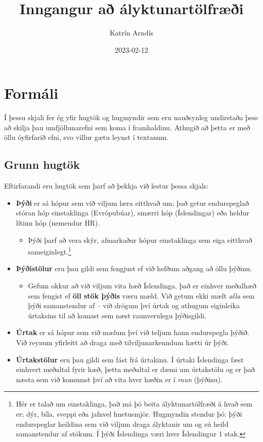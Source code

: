 \documentclass[
]{book}
\title{Inngangur að ályktunartölfræði}
\author{Katrín Arndís}
\date{2023-02-12}
\providecommand{\tightlist}{%
  \setlength{\itemsep}{0pt}\setlength{\parskip}{0pt}}
\begin{document}
\maketitle

{
\setcounter{tocdepth}{1}
\tableofcontents
}
\hypertarget{formuxe1li}{%
\chapter{Formáli}\label{formuxe1li}}

Í þessu skjali fer ég yfir hugtök og hugmyndir sem eru nauðsynleg
undirstaða þess að skilja þau umfjöllunarefni sem koma í framhaldinu.
Athugið að þetta er með öllu óyfirfarið efni, svo villur gætu leynst í
textanum.

\hypertarget{grunn-hugtuxf6k}{%
\section{Grunn hugtök}\label{grunn-hugtuxf6k}}

Eftirfarandi eru hugtök sem þarf að þekkja við lestur þessa skjals:

\begin{itemize}
\tightlist
\item
  \textbf{Þýði} er sá hópur sem við viljum læra eitthvað um; það getur
  endurspeglað stóran hóp einstaklinga (Evrópubúar), smærri hóp
  (Íslendingar) eða heldur lítinn hóp (nemendur HR).

  \begin{itemize}
  \tightlist
  \item
    Þýði þarf að vera skýr, afmarkaður hópur einstaklinga sem eiga
    eitthvað sameiginlegt.\footnote{Hér er talað um einstaklinga, það má þó beita
      ályktunartölfræði á hvað sem er; dýr, bíla, sveppi eða jafnvel
      hnetusmjör. Hugmyndin stendur þó: þýði endurspeglar heildina sem við
      viljum draga ályktanir um og sú heild samanstendur af stökum. Í þýði
      Íslendinga væri hver Íslendingur 1 stak.}
  \end{itemize}
\item
  \textbf{Þýðistölur} eru þau gildi sem fengjust ef við hefðum aðgang að
  öllu þýðinu.

  \begin{itemize}
  \tightlist
  \item
    Gefum okkur að við viljum vita hæð Íslendinga, það er einhver
    meðalhæð sem fengist ef \textbf{öll stök þýðis} væru mæld. Við getum
    ekki mælt \emph{alla} sem þýði samanstendur af -- við drögum því
    úrtak og athugum eiginleika úrtaksins til að komast sem næst
    raunverulegu þýðisgildi.
  \end{itemize}
\item
  \textbf{Úrtak} er sá hópur sem við mælum því við teljum hann endurspegla
  þýðið. Við reynum yfirleitt að draga með tilviljunarkenndum hætti úr
  þýði.
\item
  \textbf{Úrtakstölur} eru þau gildi sem fást frá úrtakinu. Í úrtaki
  Íslendinga fæst einhvert meðaltal fyrir hæð, þetta meðaltal er dæmi
  um úrtakstölu og er það næsta sem við komumst því að vita hver hæðin
  er í \emph{raun} (þýðinu).
\end{itemize}
\end{document}
